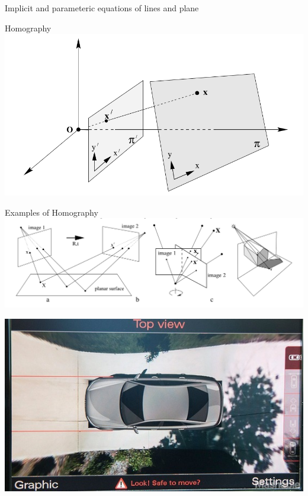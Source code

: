 \documentclass[times,t]{beamer}
\begin{document}
\begin{frame}
\end{frame}

\begin{frame}{Implicit and parameteric equations of lines and plane} 

\end{frame}

\begin{frame}{Homography}
  \includegraphics[width=\linewidth]{media/homography-maps-a-line-to-a-line.png}
\end{frame}

\begin{frame}{Examples  of  Homography}
  \includegraphics[width=\linewidth]{media/examples-of-homography.png}
\end{frame}

\begin{frame}
  \includegraphics[width=0.60\linewidth]{media/audi top view camera.jpg}
\end{frame}
\end{document}
